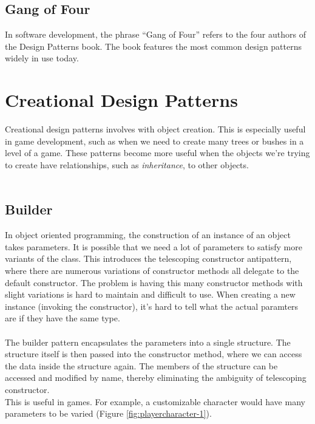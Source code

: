 \documentclass[10pt,letterpaper]{article}
\begin{document}
\begin{multicols}{2}
\subsection{Gang of Four}

In software development, the phrase ``Gang of Four'' refers to the four authors of the Design Patterns book. The book features the most common design patterns widely in use today.\\


\section{Creational Design Patterns}

Creational design patterns involves with object creation.\cite{sm-creationaldp} This is especially useful in game development, such as when we need to create many trees or bushes in a level of a game. These patterns become more useful when the objects we're trying to create have relationships, such as \textit{inheritance}, to other objects.\\
\\

\subsection{Builder}

In object oriented programming, the construction of an instance of an object takes parameters. It is possible  that we need a lot of parameters to satisfy more variants of the class. This introduces the telescoping constructor antipattern\cite{telescopingconstructor}, where there are numerous variations of constructor methods all delegate to the default constructor. The problem is having this many constructor methods with slight variations is hard to maintain and difficult to use. When creating a new instance (invoking the constructor), it's hard to tell what the actual paramters are if they have the same type.\\
\\
The builder pattern encapsulates the parameters into a single structure. The structure itself is then passed into the constructor method, where we can access the data inside the structure again. The members of the structure can be accessed and modified by name, thereby eliminating the ambiguity of telescoping constructor.\\

This is useful in games. For example, a customizable character would have many parameters to be varied (Figure \ref{fig:playercharacter-1}).


\end{multicols}
\end{document}
